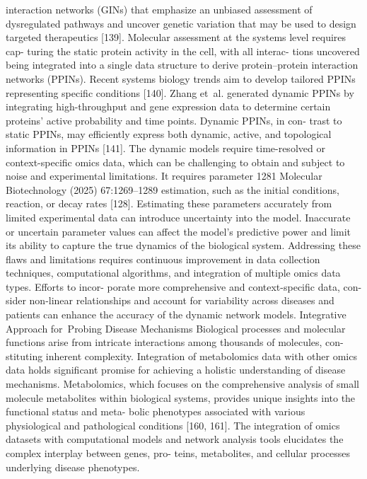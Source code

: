 interaction networks (GINs) that emphasize an unbiased
assessment of dysregulated pathways and uncover genetic
variation that may be used to design targeted therapeutics
[139].
Molecular assessment at the systems level requires cap-
turing the static protein activity in the cell, with all interac-
tions uncovered being integrated into a single data structure
to derive protein–protein interaction networks (PPINs).
Recent systems biology trends aim to develop tailored
PPINs representing specific conditions [140]. Zhang et al.
generated dynamic PPINs by integrating high-throughput
and gene expression data to determine certain proteins’
active probability and time points. Dynamic PPINs, in con-
trast to static PPINs, may efficiently express both dynamic,
active, and topological information in PPINs [141]. The
dynamic models require time-resolved or context-specific
omics data, which can be challenging to obtain and subject
to noise and experimental limitations. It requires parameter
1281
Molecular Biotechnology (2025) 67:1269–1289
estimation, such as the initial conditions, reaction, or decay
rates [128]. Estimating these parameters accurately from
limited experimental data can introduce uncertainty into the
model. Inaccurate or uncertain parameter values can affect
the model’s predictive power and limit its ability to capture
the true dynamics of the biological system. Addressing these
flaws and limitations requires continuous improvement in
data collection techniques, computational algorithms, and
integration of multiple omics data types. Efforts to incor-
porate more comprehensive and context-specific data, con-
sider non-linear relationships and account for variability
across diseases and patients can enhance the accuracy of
the dynamic network models.
Integrative Approach for Probing Disease
Mechanisms
Biological processes and molecular functions arise from
intricate interactions among thousands of molecules, con-
stituting inherent complexity. Integration of metabolomics
data with other omics data holds significant promise for
achieving a holistic understanding of disease mechanisms.
Metabolomics, which focuses on the comprehensive analysis
of small molecule metabolites within biological systems,
provides unique insights into the functional status and meta-
bolic phenotypes associated with various physiological and
pathological conditions [160, 161]. The integration of omics
datasets with computational models and network analysis
tools elucidates the complex interplay between genes, pro-
teins, metabolites, and cellular processes underlying disease
phenotypes.
